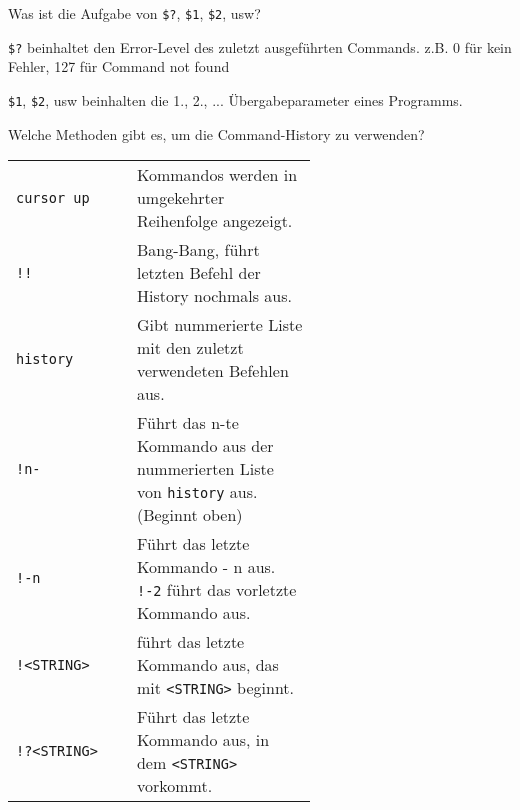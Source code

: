 \begin{flashcard}[Variable]{Was ist die Aufgabe von \texttt{\$?}, \texttt{\$1}, \texttt{\$2}, usw?}
	\begin{description}
		\item \texttt{\$?} beinhaltet den Error-Level des zuletzt ausgeführten Commands. z.B. 0 für kein Fehler, 127 für Command not found
		
		\item \texttt{\$1}, \texttt{\$2}, usw beinhalten die 1., 2., ... Übergabeparameter eines Programms.
	\end{description}
\end{flashcard}

\begin{flashcard}[Command]{Welche Methoden gibt es, um die Command-History zu verwenden?}
	\begin{tabular}{lp{0.6\linewidth}}
		\texttt{cursor up}			& Kommandos werden in umgekehrter Reihenfolge angezeigt.\\
		
		\texttt{!!}					& Bang-Bang, führt letzten Befehl der History nochmals aus.\\
		
		\texttt{history}			& Gibt nummerierte Liste mit den zuletzt verwendeten Befehlen aus.\\
		
		\texttt{!n-}				& Führt das n-te Kommando aus der nummerierten Liste von \texttt{history} aus. (Beginnt oben) \\

		\texttt{!-n}				& Führt das letzte Kommando - n aus. \texttt{!-2} führt das vorletzte Kommando aus.\\
				
		\texttt{!<STRING>}	& führt das letzte Kommando aus, das mit \texttt{<STRING>} beginnt.\\
		
		\texttt{!?<STRING>}	& Führt das letzte Kommando aus, in dem \texttt{<STRING>} vorkommt.
	\end{tabular}
\end{flashcard}

\begin{flashcard}[TO DO]{}	
\end{flashcard}